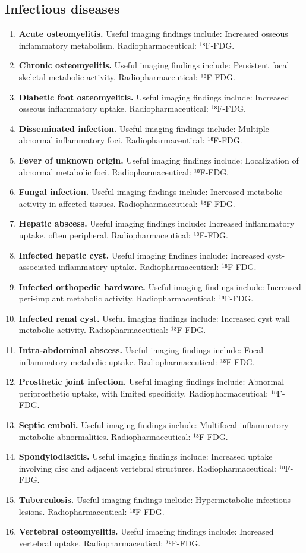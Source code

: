 \subsection{Infectious diseases}
\begin{enumerate}[leftmargin=*,itemsep=0.45em,topsep=0.4em]
\item \textbf{Acute osteomyelitis.} Useful imaging findings include: Increased osseous inflammatory metabolism. Radiopharmaceutical: ¹⁸F-FDG.
\item \textbf{Chronic osteomyelitis.} Useful imaging findings include: Persistent focal skeletal metabolic activity. Radiopharmaceutical: ¹⁸F-FDG.
\item \textbf{Diabetic foot osteomyelitis.} Useful imaging findings include: Increased osseous inflammatory uptake. Radiopharmaceutical: ¹⁸F-FDG.
\item \textbf{Disseminated infection.} Useful imaging findings include: Multiple abnormal inflammatory foci. Radiopharmaceutical: ¹⁸F-FDG.
\item \textbf{Fever of unknown origin.} Useful imaging findings include: Localization of abnormal metabolic foci. Radiopharmaceutical: ¹⁸F-FDG.
\item \textbf{Fungal infection.} Useful imaging findings include: Increased metabolic activity in affected tissues. Radiopharmaceutical: ¹⁸F-FDG.
\item \textbf{Hepatic abscess.} Useful imaging findings include: Increased inflammatory uptake, often peripheral. Radiopharmaceutical: ¹⁸F-FDG.
\item \textbf{Infected hepatic cyst.} Useful imaging findings include: Increased cyst-associated inflammatory uptake. Radiopharmaceutical: ¹⁸F-FDG.
\item \textbf{Infected orthopedic hardware.} Useful imaging findings include: Increased peri-implant metabolic activity. Radiopharmaceutical: ¹⁸F-FDG.
\item \textbf{Infected renal cyst.} Useful imaging findings include: Increased cyst wall metabolic activity. Radiopharmaceutical: ¹⁸F-FDG.
\item \textbf{Intra-abdominal abscess.} Useful imaging findings include: Focal inflammatory metabolic uptake. Radiopharmaceutical: ¹⁸F-FDG.
\item \textbf{Prosthetic joint infection.} Useful imaging findings include: Abnormal periprosthetic uptake, with limited specificity. Radiopharmaceutical: ¹⁸F-FDG.
\item \textbf{Septic emboli.} Useful imaging findings include: Multifocal inflammatory metabolic abnormalities. Radiopharmaceutical: ¹⁸F-FDG.
\item \textbf{Spondylodiscitis.} Useful imaging findings include: Increased uptake involving disc and adjacent vertebral structures. Radiopharmaceutical: ¹⁸F-FDG.
\item \textbf{Tuberculosis.} Useful imaging findings include: Hypermetabolic infectious lesions. Radiopharmaceutical: ¹⁸F-FDG.
\item \textbf{Vertebral osteomyelitis.} Useful imaging findings include: Increased vertebral uptake. Radiopharmaceutical: ¹⁸F-FDG.
\end{enumerate}

